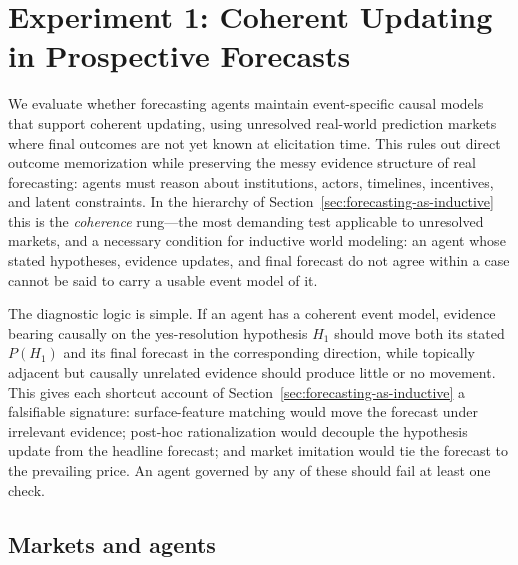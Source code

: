 
\section{Experiment 1: Coherent Updating in Prospective Forecasts}
\label{sec:exp1}

We evaluate whether forecasting agents maintain event-specific causal models that support
coherent updating, using unresolved real-world prediction markets where final outcomes are
not yet known at elicitation time.  This rules out direct outcome memorization
\citep{zou2022forecasting,halawi2024approaching} while preserving the messy evidence
structure of real forecasting: agents must reason about institutions, actors, timelines,
incentives, and latent constraints.  In the hierarchy of
Section~\ref{sec:forecasting-as-inductive} this is the \emph{coherence} rung---the most
demanding test applicable to unresolved markets, and a necessary condition for inductive
world modeling: an agent whose stated hypotheses, evidence updates, and final forecast do
not agree within a case cannot be said to carry a usable event model of it.

The diagnostic logic is simple.  If an agent has a coherent event model, evidence bearing
causally on the yes-resolution hypothesis $H_1$ should move both its stated $P(H_1)$ and
its final forecast in the corresponding direction, while topically adjacent but causally
unrelated evidence should produce little or no movement.  This gives each shortcut account
of Section~\ref{sec:forecasting-as-inductive} a falsifiable signature: surface-feature
matching would move the forecast under irrelevant evidence; post-hoc rationalization
\citep{turpin2023language} would decouple the hypothesis update from the headline forecast;
and market imitation would tie the forecast to the prevailing price.  An agent governed by
any of these should fail at least one check.

\subsection{Markets and agents}
\label{sec:markets-agents}

